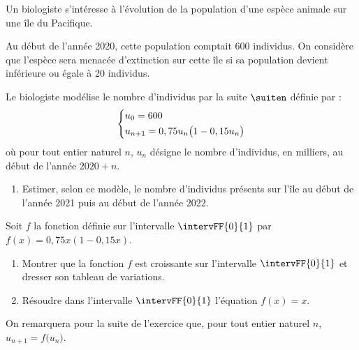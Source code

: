 Un biologiste s’intéresse à l’évolution de la population d’une espèce animale sur une île du Pacifique.

Au début de l’année 2020, cette population comptait 600 individus. On considère que l’espèce sera menacée 
d’extinction sur cette île si sa population devient inférieure ou égale à 20 individus.

\smallskip

Le biologiste modélise le nombre d’individus par la suite $\suiten$ définie par :\[ \begin{dcases} u_0 = 600 \\ u_{n+1}=0,75u_n \big( 1-0,15u_n \big) \end{dcases} \] %
où pour tout entier naturel $n$, $u_n$ désigne le nombre d’individus, en milliers, au début de l’année $2020+n$.

\begin{enumerate}
	\item Estimer, selon ce modèle, le nombre d’individus présents sur l’île au début de l’année 2021 puis au début de l’année 2022.
\end{enumerate} 

Soit $f$ la fonction définie sur l’intervalle $\intervFF{0}{1}$ par $f(x)=0,75x(1-0,15x)$.

\begin{enumerate}[resume]
	\item Montrer que la fonction $f$ est croissante sur l’intervalle $\intervFF{0}{1}$ et dresser son tableau de variations.
	\item Résoudre dans l’intervalle $\intervFF{0}{1}$ l’équation $f(x)=x$.
\end{enumerate}

On remarquera pour la suite de l’exercice que, pour tout entier naturel $n$, $u_{n+1}=f \big(u_n\big)$.

